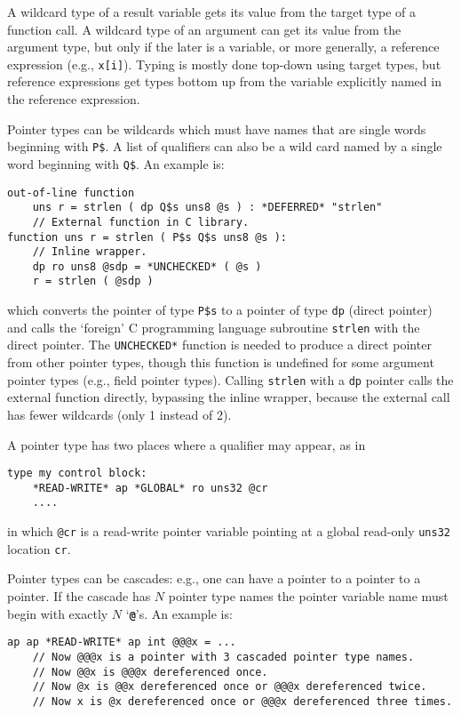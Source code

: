 \documentclass[12pt]{article}
\newcommand{\TT}[1]{{\tt \bfseries #1}}
\newenvironment{indpar}[1][0.3in]%
	{\begin{list}{}%
		     {\setlength{\itemsep}{0in}%
		      \setlength{\topsep}{0in}%
		      \setlength{\parsep}{1ex}%
		      \setlength{\labelwidth}{#1}%
		      \setlength{\leftmargin}{#1}%
		      \addtolength{\leftmargin}{\labelsep}}%
	 \item}%
	{\end{list}}
\begin{document}
A wildcard type of a result variable gets its value from the
target type of a function call.  A wildcard type of an argument
can get its value from the argument type, but only if the
later is a variable, or more generally, a reference expression
(e.g., {\tt x[i]}).
Typing is mostly done top-down using target types, but reference
expressions get types bottom up from the variable explicitly named
in the reference expression.

Pointer types can be wildcards which must have names that are
single words beginning with {\tt P\$}.  A list of qualifiers
can also be a wild card named by a single word beginning with
{\tt Q\$}.  An example is:

\begin{indpar}\begin{verbatim}
out-of-line function
    uns r = strlen ( dp Q$s uns8 @s ) : *DEFERRED* "strlen"
    // External function in C library.
function uns r = strlen ( P$s Q$s uns8 @s ):
    // Inline wrapper.
    dp ro uns8 @sdp = *UNCHECKED* ( @s )
    r = strlen ( @sdp )
\end{verbatim}\end{indpar}

which converts the pointer of type {\tt P\$s} to a pointer of
type {\tt dp} (direct pointer) and calls the `foreign' C programming
language subroutine {\tt strlen} with the direct pointer.
The {\tt *UNCHECKED*} function is needed to produce a direct pointer
from other pointer types, though this function is undefined
for some argument pointer types (e.g., field pointer types).
Calling {\tt strlen} with a {\tt dp} pointer calls the external
function directly, bypassing the inline wrapper, because the
external call has fewer wildcards (only 1 instead of 2).

A pointer type
has two places where a qualifier may appear, as in
\begin{indpar}\begin{verbatim}
type my control block:
    *READ-WRITE* ap *GLOBAL* ro uns32 @cr
    ....
\end{verbatim}\end{indpar}
in which {\tt @cr} is a read-write pointer variable pointing at a global
read-only {\tt uns32} location {\tt cr}.

Pointer types can be cascades: e.g., one can have a pointer to a pointer
to a pointer.  If the cascade has $N$ pointer type names the pointer
variable name must begin with exactly $N$ `\TT{@}'s.  An example is:
\begin{indpar}\begin{verbatim}
ap ap *READ-WRITE* ap int @@@x = ...
    // Now @@@x is a pointer with 3 cascaded pointer type names.
    // Now @@x is @@@x dereferenced once.
    // Now @x is @@x dereferenced once or @@@x dereferenced twice.
    // Now x is @x dereferenced once or @@@x dereferenced three times.
\end{verbatim}\end{indpar}
\end{document}
